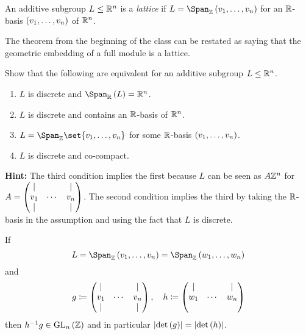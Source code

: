 \documentclass[11pt]{karticle}
\begin{document}
\begin{definition}
An additive subgroup $L \leq \mathbb{R}^n$ is a \emph{lattice} if $L = \Span_{\mbb{Z}}\prs{v_1, \ldots, v_n}$ for an $\mathbb{R}$-basis $\left( v_1, \ldots, v_n \right)$ of $\mathbb{R}^n$.
\end{definition}

\begin{remark}
The theorem from the beginning of the class
can be restated as saying that the geometric embedding of a full module is a lattice.
\end{remark}

\begin{exercise}
Show that the following are equivalent for an additive subgroup $L \leq \mathbb{R}^n$.

\begin{enumerate}
\item $L$ is discrete and $\Span_{\mbb{R}}\prs{L} = \mbb{R}^n$.

\item $L$ is discrete and contains an $\mathbb{R}$-basis of $\mathbb{R}^n$.

\item $L = \Span_{\mbb{Z}}\set{v_1, \ldots, v_n}$ for some $\mathbb{R}$-basis $\left( v_1, \ldots, v_n \right)$.

\item $L$ is discrete and co-compact.
\end{enumerate}

\textbf{Hint:} The third condition implies the first because $L$ can be seen as $A \mathbb{Z}^n$ for $A = \begin{pmatrix}\vert & & \vert \\ v_1 & \cdots & v_n \\ \vert & & \vert\end{pmatrix}$.
The second condition implies the third by taking the $\mathbb{R}$-basis in the assumption and using the fact that $L$ is discrete. 
\end{exercise}

\begin{proposition}
If \[L = \Span_{\mbb{Z}}\prs{v_1, \ldots, v_n} = \Span_{\mbb{Z}}\prs{w_1, \ldots, w_n}\]
and
\begin{align*}
g \coloneqq \begin{pmatrix}\vert & & \vert \\ v_1 & \cdots & v_n \\ \vert & &  \vert\end{pmatrix} ,\quad h \coloneqq \begin{pmatrix}\vert & & \vert \\ w_1 & \cdots & w_n \\ & &\end{pmatrix}
\end{align*}
then $h^{-1} g \in \mathrm{GL}_n\left( \mathbb{Z} \right)$ and in particular $\left| \det\left( g \right) \right| = \left| \det\left( h \right) \right|$.
\end{proposition}
\end{document}
